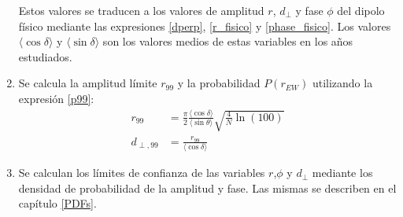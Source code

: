 \begin{enumerate}
    Estos valores se traducen a los valores de amplitud $r$, $d_\perp$ y fase $\phi$ del dipolo físico mediante las expresiones \ref{dperp}, \ref{r_fisico} y \ref{phase_fisico}.   Los valores $\langle\cos\delta \rangle$ y $\langle\sin\delta \rangle$ son los valores medios de estas variables en los años estudiados. 

    \item Se calcula la amplitud límite $r_{99}$ y la probabilidad  $P(r_{EW})$ utilizando la expresión \ref{p99}:
    \begin{align*}
        r_{99} &= \frac{\pi}{2} \frac{\langle\cos\delta \rangle}{\langle\sin\theta \rangle}\sqrt{\frac{4}{N}\ln(100)}\\
        d_{\perp,99} &= \frac{r_{99}}{\langle\cos\delta \rangle}    
    \end{align*}

    \item Se calculan los límites de confianza de las variables $r$,$\phi$ y $d_\perp$ mediante los densidad de probabilidad de la amplitud y fase. Las mismas se describen en el capítulo \ref{PDFs}.
    
        


\end{enumerate}



